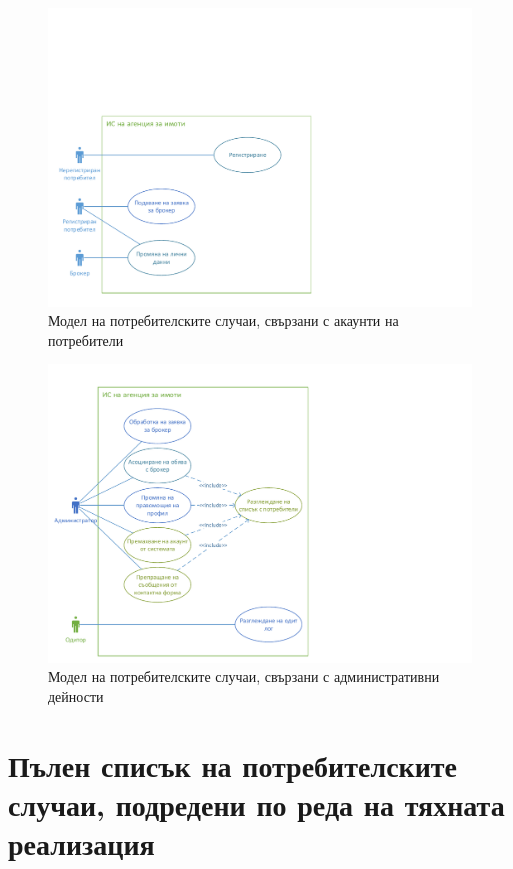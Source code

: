 \documentclass[a4paper]{article}
\begin{document}
\clearpage

        \begin{figure}[h]
        \centering
        \includegraphics[scale=1]{uc2c}
        \caption{Модел на потребителските случаи, свързани с акаунти на потребители}
        \end{figure}

\clearpage

        \begin{figure}[h]
        \centering
        \includegraphics[scale=1]{uc2d}
        \caption{Модел на потребителските случаи, свързани с административни дейности}
        \end{figure}

\clearpage
\section{Пълен списък на потребителските случаи, подредени по реда на тяхната реализация}
\end{document}
